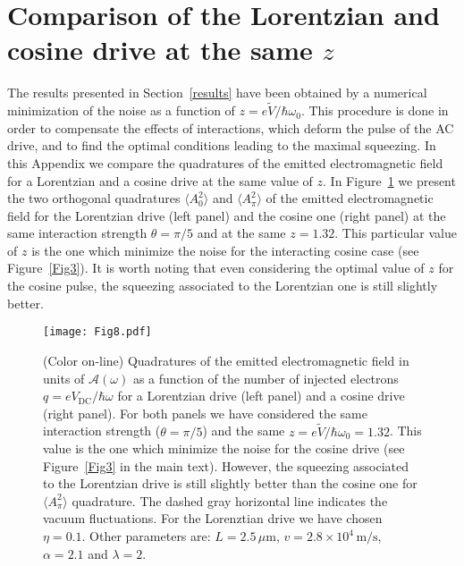 \documentclass[12pt]{iopart}
\begin{document}
\section{Comparison of the Lorentzian and cosine drive at the same $z$}
\label{app2}
The results presented in Section~\ref{results} have been obtained by a numerical minimization of the noise as a function of $z=e\tilde{V}/\hbar\omega_0$. This procedure is done in order to compensate the effects of interactions, which deform the pulse of the AC drive, and to find the optimal conditions leading to the maximal squeezing. In this Appendix we compare the quadratures of the emitted electromagnetic field for a Lorentzian and a cosine drive at the same value of $z$. In Figure~\ref{Fig8} we present the two orthogonal quadratures $\langle A^2_0 \rangle$ and $\langle A^2_\pi \rangle$ of the emitted electromagnetic field for the Lorentzian drive (left panel) and the cosine one (right panel) at the same interaction strength $\theta=\pi/5$ and at the same $z=1.32$. This particular value of $z$ is the one which minimize the noise for the interacting cosine case (see Figure~\ref{Fig3}). It is worth noting that even considering the optimal value of $z$ for the cosine pulse, the squeezing associated to the Lorentzian one is still slightly better.
\begin{figure}[ht]
\centering
\texttt{[image: Fig8.pdf]}
\caption{(Color on-line) Quadratures of the emitted electromagnetic field in units of $\mathcal{A}(\omega)$ as a function of the number of injected electrons $q=eV_{\mathrm{DC}}/\hbar\omega$ for a Lorentzian drive (left panel) and a cosine drive (right panel). For both panels we have considered the same interaction strength ($\theta=\pi/5$) and the same $z=e\tilde{V}/\hbar\omega_0=1.32$. This value is the one which minimize the noise for the cosine drive (see Figure~\ref{Fig3} in the main text). However, the squeezing associated to the Lorentzian drive is still slightly better than the cosine one for $\langle A^2_\pi \rangle$ quadrature. The dashed gray horizontal line indicates the vacuum fluctuations. For the Lorenztian drive we have chosen $\eta=0.1$. Other parameters are: $L=2.5\,\mu\mathrm{m}$, $v=2.8\times 10^4\, \mathrm{m/s}$, $\alpha=2.1$ and $\lambda=2$.} 
\label{Fig8}
\end{figure}  
\end{document}
